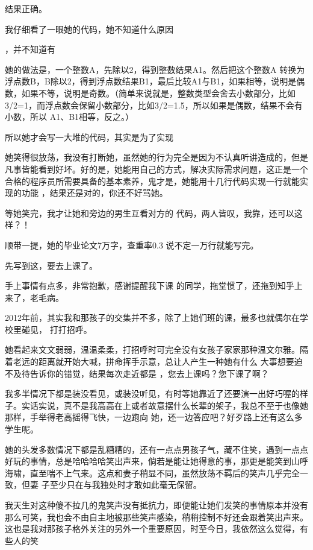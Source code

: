 \documentclass{article}
\begin{document}
结果正确。 

我仔细看了一眼她的代码，她不知道什么原因
\newpage

，并不知道有%

她的做法是，一个整数A，先除以2，得到整数结果A1。然后把这个整数A 转换为浮点数B，B除以2，得到浮点数结果B1，最后比较A1与B1，如果相等，说明是偶数，如果不等，说明是奇数。（简单来说就是，整数类型会舍去小数部分，比如3/2=1，而浮点数会保留小数部分，比如3/2=1.5，所以如果是偶数，结果不会有小数，所以
A1、B1相等，反之。） 

所以她才会写一大堆的代码，其实是为了实现

她笑得很放荡，我没有打断她，虽然她的行为完全是因为不认真听讲造成的，但是凡事皆能看到好坏。好的是，她能用自己的方式，解决实际需求问题，这正是一个合格的程序员所需要具备的基本素养，鬼才是，她能用十几行代码实现一行就能实现的功能
，结果还是对的，你还不好骂她。 

\newpage

等她笑完，我才让她和旁边的男生互看对方的
代码，两人皆叹，我靠，还可以这样？！ 

顺带一提，她的毕业论文7万字，查重率0.3%
说不定一万行就能写完。 


先写到这，要去上课了。 


手上事情有点多，非常抱歉，感谢提醒我下课
的同学，拖堂惯了，还拖到知乎上来了，老毛病。 

2012年前，其实我和那孩子的交集并不多，除了上她们班的课，最多也就偶尔在学校里碰见，
打打招呼。 

她看起来文文弱弱，温温柔柔，打招呼时可完全没有女孩子家家那种温文尔雅。隔着老远的距离就开始大喊，拼命挥手示意，总让人产生一种她有什么
\newpage
大事想要迫不及待告诉你的错觉，结果每次走近都是
，您去上课吗？您下课了啊？ 

我多半情况下都是装没看见，或装没听见，有时等她靠近了还要演一出好巧喔的样子。实话实说，真不是我高高在上或者故意摆什么长辈的架子，我总不至于也像她那样，手举得老高摇得飞快，一边跑向
她，还一边答应吧？好歹路上还有这么多学生呢。 

她的头发多数情况下都是乱糟糟的，还有一点点男孩子气，藏不住笑，遇到一点点好玩的事情，总是哈哈哈哈笑出声来，倘若是能让她得意的事，那更是能笑到山呼海啸，直至喘不上气来。这点和妻子稍显不同，虽然放荡不羁后的笑声几乎完全一致，但妻
子至少只在与我独处时才敢如此毫无保留。 

我天生对这种傻不拉几的鬼笑声没有抵抗力，即便能让她们发笑的事情原本并没有那么可笑，我也会不由自主地被那些笑声感染，稍稍控制不好还会跟着笑出声来。这也是我对那孩子格外关注的另外一个重要原因，时至今日，我依然这么觉得，有些人的笑
\newpage
\end{document}
